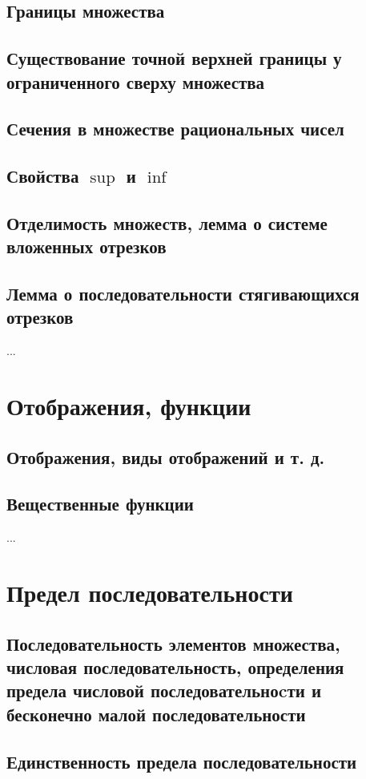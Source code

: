 \subsection{Границы множества}
\subsection{Существование точной верхней границы у ограниченного сверху множества}
\subsection{Сечения в множестве рациональных чисел}
\subsection{Свойства $\sup$ и $\inf$}
\subsection{Отделимость множеств, лемма о системе вложенных отрезков}
\subsection{Лемма о последовательности стягивающихся отрезков}
...

\section{Отображения, функции}
\subsection{Отображения, виды отображений и т. д.}
\subsection{Вещественные функции}
...

\section{Предел последовательности}
\subsection{Последовательность элементов множества, числовая последовательность, определения предела числовой последовательноcти и бесконечно малой последовательности}

\subsection{Единственность предела последовательности}
